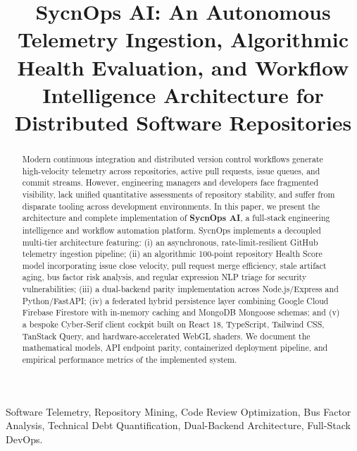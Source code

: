 \documentclass[conference]{IEEEtran}
\begin{document}
\title{SycnOps AI: An Autonomous Telemetry Ingestion, Algorithmic Health Evaluation, and Workflow Intelligence Architecture for Distributed Software Repositories}

\author{
}

\maketitle

\begin{abstract}
Modern continuous integration and distributed version control workflows generate high-velocity telemetry across repositories, active pull requests, issue queues, and commit streams. However, engineering managers and developers face fragmented visibility, lack unified quantitative assessments of repository stability, and suffer from disparate tooling across development environments. In this paper, we present the architecture and complete implementation of \textbf{SycnOps AI}, a full-stack engineering intelligence and workflow automation platform. SycnOps implements a decoupled multi-tier architecture featuring: (i) an asynchronous, rate-limit-resilient GitHub telemetry ingestion pipeline; (ii) an algorithmic 100-point repository Health Score model incorporating issue close velocity, pull request merge efficiency, stale artifact aging, bus factor risk analysis, and regular expression NLP triage for security vulnerabilities; (iii) a dual-backend parity implementation across Node.js/Express and Python/FastAPI; (iv) a federated hybrid persistence layer combining Google Cloud Firebase Firestore with in-memory caching and MongoDB Mongoose schemas; and (v) a bespoke Cyber-Serif client cockpit built on React 18, TypeScript, Tailwind CSS, TanStack Query, and hardware-accelerated WebGL shaders. We document the mathematical models, API endpoint parity, containerized deployment pipeline, and empirical performance metrics of the implemented system.
\end{abstract}

\begin{IEEEkeywords}
Software Telemetry, Repository Mining, Code Review Optimization, Bus Factor Analysis, Technical Debt Quantification, Dual-Backend Architecture, Full-Stack DevOps.
\end{IEEEkeywords}
\end{document}

